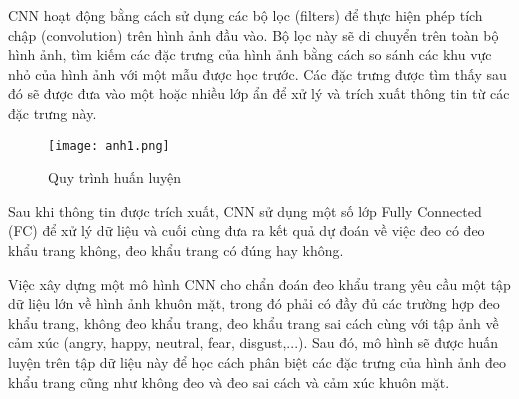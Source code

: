 CNN hoạt động bằng cách sử dụng các bộ lọc (filters) để thực hiện phép tích chập (convolution) trên hình ảnh đầu vào. Bộ lọc này sẽ di chuyển trên toàn bộ hình ảnh, tìm kiếm các đặc trưng của hình ảnh bằng cách so sánh các khu vực nhỏ của hình ảnh với một mẫu được học trước. Các đặc trưng được tìm thấy sau đó sẽ được đưa vào một hoặc nhiều lớp ẩn để xử lý và trích xuất thông tin từ các đặc trưng này.

\begin{figure}[h!]
	\centering
	\texttt{[image: anh1.png]}
	\caption[Quy trình huấn luyện ]{Quy trình huấn luyện}
	\label{fig:mohinh}
\end{figure} 

Sau khi thông tin được trích xuất, CNN sử dụng một số lớp Fully Connected (FC) để xử lý dữ liệu và cuối cùng đưa ra kết quả dự đoán về việc đeo có đeo khẩu trang không, đeo khẩu trang có đúng hay không.

Việc xây dựng một mô hình CNN cho chẩn đoán đeo khẩu trang yêu cầu một tập dữ liệu lớn về hình ảnh khuôn mặt, trong đó phải có đầy đủ các trường hợp đeo khẩu trang, không đeo khẩu trang, đeo khẩu trang sai cách cùng với tập ảnh về cảm xúc (angry, happy, neutral, fear, disgust,...). Sau đó, mô hình sẽ được huấn luyện trên tập dữ liệu này để học cách phân biệt các đặc trưng của hình ảnh đeo khẩu trang cũng như không đeo và đeo sai cách và cảm xúc khuôn mặt.


